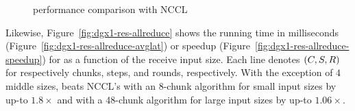 \begin{figure}[tbp]
  \centering
  \hfill
  \caption{\alltoall performance comparison with NCCL}
  \label{fig:dgx1-res-alltoall}
\end{figure}

Likewise, Figure~\ref{fig:dgx1-res-allreduce} shows the running time
in milliseconds (Figure~\ref{fig:dgx1-res-allreduce-avglat}) or
speedup (Figure~\ref{fig:dgx1-res-allreduce-speedup}) for \allreduce
as a function of the receive input size.  Each line denotes $(C,
S, R)$ for respectively chunks, steps, and rounds,
respectively. With the exception of $4$ middle sizes, \tool{} beats
NCCL's \allreduce with an 8-chunk algorithm for small input sizes by
up-to $1.8\times$ and with a 48-chunk algorithm for large input sizes
by up-to $1.06\times$.

